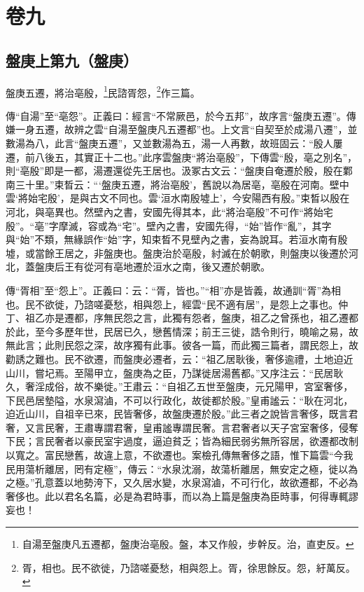 

\chapter{卷九}


\section{盤庚上第九（盤庚）}


盤庚五遷，將治亳殷，\footnote{自湯至盤庚凡五遷都，盤庚治亳殷。盤，本又作般，步幹反。治，直吏反。}民諮胥怨，\footnote{胥，相也。民不欲徙，乃諮嗟憂愁，相與怨上。胥，徐思餘反。怨，紆萬反。}作三篇。

{\noindent\zhuan{}\fzbyks 傳“自湯”至“亳怨”。正義曰：經言“不常厥邑，於今五邦”，故序言“盤庚五遷”。傳嫌一身五遷，故辨之雲“自湯至盤庚凡五遷都”也。上文言“自契至於成湯八遷”，並數湯為八，此言“盤庚五遷”，又並數湯為五，湯一人再數，故班固云：“殷人屢遷，前八後五，其實正十二也。”此序雲盤庚“將治亳殷”，下傳雲“殷，亳之別名”，則“亳殷”即是一都，湯遷還從先王居也。汲冢古文云：“盤庚自奄遷於殷，殷在鄴南三十里。”束晳云：“‘盤庚五遷，將治亳殷’，舊說以為居亳，亳殷在河南。壁中雲‘將始宅殷’，是與古文不同也。雲‘洹水南殷墟上’，今安陽西有殷。”束晳以殷在河北，與亳異也。然壁內之書，安國先得其本，此“將治亳殷”不可作“將始宅殷”。“亳”字摩滅，容或為“宅”。壁內之書，安國先得，“始”皆作“亂”，其字與“始”不類，無緣誤作“始”字，知束晳不見壁內之書，妄為說耳。若洹水南有殷墟，或當餘王居之，非盤庚也。盤庚治於亳殷，紂滅在於朝歌，則盤庚以後遷於河北，蓋盤庚后王有從河有亳地遷於洹水之南，後又遷於朝歌。 \par}

{\noindent\zhuan{}\fzbyks 傳“胥相”至“怨上”。正義曰：云：“胥，皆也。”“相”亦是皆義，故通訓“胥”為相也。民不欲徙，乃諮嗟憂愁，相與怨上，經雲“民不適有居”，是怨上之事也。仲丁、祖乙亦是遷都，序無民怨之言，此獨有怨者，盤庚，祖乙之曾孫也，祖乙遷都於此，至今多歷年世，民居已久，戀舊情深；前王三徙，誥令則行，曉喻之易，故無此言；此則民怨之深，故序獨有此事。彼各一篇，而此獨三篇者，謂民怨上，故勸誘之難也。民不欲遷，而盤庚必遷者，云：“祖乙居耿後，奢侈逾禮，土地迫近山川，嘗圮焉。至陽甲立，盤庚為之臣，乃謀徙居湯舊都。”又序注云：“民居耿久，奢淫成俗，故不樂徙。”王肅云：“自祖乙五世至盤庚，元兄陽甲，宮室奢侈，下民邑居墊隘，水泉瀉滷，不可以行政化，故徙都於殷。”皇甫謐云：“耿在河北，迫近山川，自祖辛已來，民皆奢侈，故盤庚遷於殷。”此三者之說皆言奢侈，既言君奢，又言民奢，王肅專謂君奢，皇甫謐專謂民奢。言君奢者以天子宮室奢侈，侵奪下民；言民奢者以豪民室宇過度，逼迫貧乏；皆為細民弱劣無所容居，欲遷都改制以寬之。富民戀舊，故違上意，不欲遷也。案檢孔傳無奢侈之語，惟下篇雲“今我民用蕩析離居，罔有定極”，傳云：“水泉沈溺，故蕩析離居，無安定之極，徙以為之極。”孔意蓋以地勢洿下，又久居水變，水泉瀉滷，不可行化，故欲遷都，不必為奢侈也。此以君名名篇，必是為君時事，而以為上篇是盤庚為臣時事，何得專輒謬妄也！ \par}

